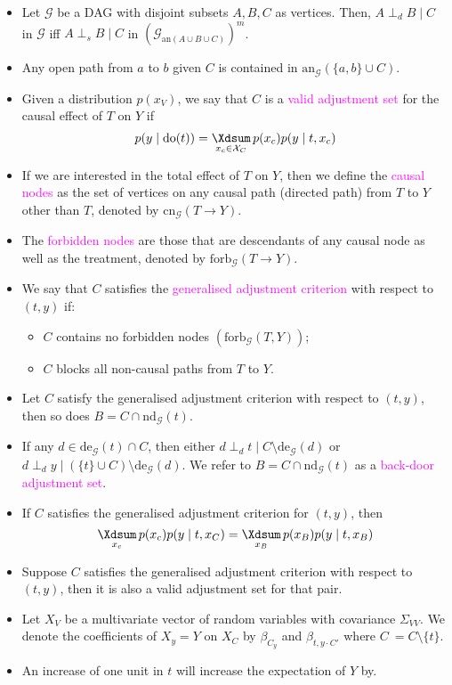 \documentclass[UTF8]{book}
\DeclareMathOperator*{\Xsum}{\mathchoice{\Xdsum}{\Xtsum}{\Xtsum}{\Xtsum}}
\newcommand{\concept}[1]{\textcolor{magenta}{#1}}
\begin{document}
\begin{itemize}
\item Let $\mathcal{G}$ be a DAG with disjoint subsets $A,B,C$ as vertices. Then, $A\perp_d B\mid C$ in $\mathcal{G}$ iff $A\perp_s B\mid C$ in $(\mathcal{G}_{\mathrm{an}(A\cup B\cup C)})^m$.
\item Any open path from $a$ to $b$ given $C$ is contained in $\mathrm{an}_\mathcal{G}(\{a,b\}\cup C)$.
\item Given a distribution $p(x_V)$, we say that $C$ is a \concept{valid adjustment set} for the causal effect of $T$ on $Y$ if
$$
p(y\mid \mathrm{do}(t)) = \Xsum_{x_c\in \mathcal{X}_C} p(x_c)p(y\mid t, x_c)
$$
\item If we are interested in the total effect of $T$ on $Y$, then we define the \concept{causal nodes} as the set of vertices on any causal path (directed path) from $T$ to $Y$ other than $T$, denoted by $\mathrm{cn}_\mathcal{G}(T\rightarrow Y)$.
\item The \concept{forbidden nodes} are those that are descendants of any causal node as well as the treatment, denoted by $\mathrm{forb}_\mathcal{G}(T\rightarrow Y)$.
\item We say that $C$ satisfies the \concept{generalised adjustment criterion} with respect to $(t,y)$ if:
\begin{itemize}
	\item $C$ contains no forbidden nodes $(\mathrm{forb}_\mathcal{G}(T,Y))$;
	\item $C$ blocks all non-causal paths from $T$ to $Y$.
\end{itemize}
\item Let $C$ satisfy the generalised adjustment criterion with respect to $(t,y)$, then so does $B = C\cap \mathrm{nd}_\mathcal{G}(t)$.
\item If any $d\in\mathrm{de}_\mathcal{G}(t)\cap C$, then either $d\perp_d t\mid C\setminus\mathrm{de}_\mathcal{G}(d)$ or $d\perp_d y\mid (\{t\}\cup C)\setminus \mathrm{de}_\mathcal{G}(d)$. We refer to $B = C\cap \mathrm{nd}_\mathcal{G}(t)$ as a \concept{back-door adjustment set}.
\item If $C$ satisfies the generalised adjustment criterion for $(t,y)$, then
$$
\Xsum_{x_c}p(x_c)p(y\mid t, x_C) = \Xsum_{x_B}p(x_B)p(y\mid t, x_B)
$$
\item Suppose $C$ satisfies the generalised adjustment criterion with respect to $(t,y)$, then it is also a valid adjustment set for that pair.
\item Let $X_V$ be a multivariate vector of random variables with covariance $\Sigma_{VV}$. We denote the coefficients of $X_y = Y$ on $X_C$ by $\beta_{C_y}$ and $\beta_{t,y\cdot C'}$ where $C\ = C\setminus\{t\}$.
\item An increase of one unit in $t$ will increase the expectation of $Y$ by.
\end{itemize}
\end{document}
